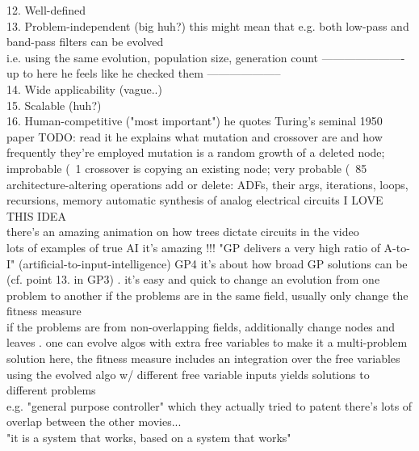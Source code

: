 \documentclass{article}\usepackage[margin=2cm]{geometry}
\begin{document}
\begin{cascade}
    12. Well-defined\\
    13. Problem-independent (big huh?)
    \stepin
    this might mean that e.g. both low-pass and band-pass filters can be evolved\\
    i.e. using the same evolution, population size, generation count
    \stepout
    ---------------------- up to here he feels like he checked them --------------------\\
    14. Wide applicability (vague..)\\
    15. Scalable (huh?)\\
    16. Human-competitive ("most important")
    \stepout
    he quotes Turing's seminal 1950 paper
    \stepin
    TODO: read it
    \stepout
    he explains what mutation and crossover are and how frequently they're employed
    \stepin
    mutation is a random growth of a deleted node; improbable (~1%
    crossover is copying an existing node; very probable (~85%
    \stepout
    architecture-altering operations add or delete:
    \stepin
    ADFs, their args, iterations, loops, recursions, memory
    \stepout
    automatic synthesis of analog electrical circuits
    \stepin
    I LOVE THIS IDEA\\
    there's an amazing animation on how trees dictate circuits in the video\\
    lots of examples of true AI
    \stepin
    it's amazing !!!
    \stepout
    \stepout
    "GP delivers a very high ratio of A-to-I" (artificial-to-input-intelligence)
    \stepout
    GP4
    \stepin
    it's about how broad GP solutions can be (cf. point 13. in GP3)
    . it's easy and quick to change an evolution from one problem to another
    \stepin
    if the problems are in the same field, usually only change the fitness measure\\
    if the problems are from non-overlapping fields, additionally change nodes and leaves
    . one can evolve algos with extra free variables to make it a multi-problem solution
    \stepin
    here, the fitness measure includes an integration over the free variables\\
    using the evolved algo w/ different free variable inputs yields solutions to different problems\\
    e.g. "general purpose controller" which they actually tried to patent
    \stepout
    \stepout
    there's lots of overlap between the other movies...\\
    "it is a system that works, based on a system that works"\\

\end{cascade}
\end{document}

